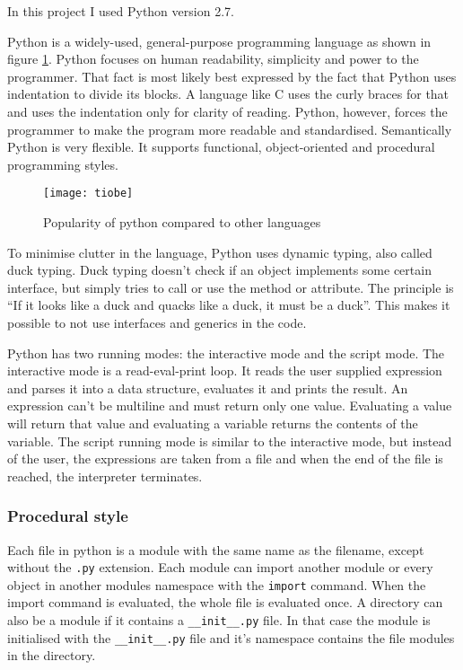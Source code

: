 In this project I used Python version 2.7.

Python is a widely-used, general-purpose programming language as shown in figure
\ref{python-popularity}. Python focuses on human readability, simplicity and
power to the
programmer.\cite{website:python-zen,website:python-faq-creation-reason} That
fact is most likely best expressed by the fact that Python uses indentation to
divide its blocks. A language like C uses the curly braces for that and uses the
indentation only for clarity of reading. Python, however, forces the programmer
to make the program more readable and standardised. Semantically Python is very
flexible. It supports functional, object-oriented and procedural programming
styles.

\begin{figure}[htp]
\begin{center}
  \texttt{[image: tiobe]}
  \caption[Python popularity]{Popularity of python compared to other
  languages\cite{website:tiobe-index}}
  \label{python-popularity}
\end{center}
\end{figure}

To minimise clutter in the language, Python uses dynamic typing, also called
duck typing. Duck typing doesn't check if an object implements some certain
interface, but simply tries to call or use the method or attribute. The
principle is ``If it looks like a duck and quacks like a duck, it must be a
duck''.\cite[duck-typing]{website:python-glossary} This makes it possible to not use
interfaces and generics in the code.

Python has two running modes: the interactive mode and the script mode. The
interactive mode is a read-eval-print loop. It reads the user supplied
expression and parses it into a data structure, evaluates it and prints the
result. An expression can't be multiline and must return only one value.
Evaluating a value will return that value and evaluating a variable returns the
contents of the variable. The script running mode is similar to the interactive
mode, but instead of the user, the expressions are taken from a file and when
the end of the file is reached, the interpreter terminates.

\subsubsection{Procedural style}
Each file in python is a module with the same name as the filename, except without the \texttt{.py} extension. Each module can import another module or every object in another modules namespace with the \texttt{import} command. When the import command is evaluated, the whole file is evaluated once. A directory can also be a module if it contains a \texttt{\_\_init\_\_.py} file. In that case the module is initialised with the \texttt{\_\_init\_\_.py} file and it's namespace contains the file modules in the directory.

